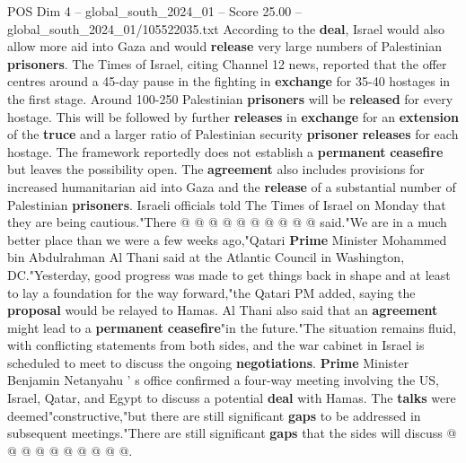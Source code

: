 \begin{textsample}{POS Dim 4 – global\_south\_2024\_01 – Score 25.00 – global\_south\_2024\_01/105522035.txt}
According to the \textbf{deal}, Israel would also allow more aid into Gaza and would \textbf{release} very large numbers of Palestinian \textbf{prisoners}.
The Times of Israel, citing Channel 12 news, reported that the offer centres around a 45-day pause in the fighting in \textbf{exchange} for 35-40 hostages in the first stage.
Around 100-250 Palestinian \textbf{prisoners} will be \textbf{released} for every hostage.
This will be followed by further \textbf{releases} in \textbf{exchange} for an \textbf{extension} of the \textbf{truce} and a larger ratio of Palestinian security \textbf{prisoner} \textbf{releases} for each hostage.
The framework reportedly does not establish a \textbf{permanent} \textbf{ceasefire} but leaves the possibility open.
The \textbf{agreement} also includes provisions for increased humanitarian aid into Gaza and the \textbf{release} of a substantial number of Palestinian \textbf{prisoners}.
Israeli officials told The Times of Israel on Monday that they are being cautious."There @ @ @ @ @ @ @ @ @ @ said."We are in a much better place than we were a few weeks ago,"Qatari \textbf{Prime} Minister Mohammed bin Abdulrahman Al Thani said at the Atlantic Council in Washington, DC."Yesterday, good progress was made to get things back in shape and at least to lay a foundation for the way forward,"the Qatari PM added, saying the \textbf{proposal} would be relayed to Hamas.
Al Thani also said that an \textbf{agreement} might lead to a \textbf{permanent} \textbf{ceasefire}"in the future."The situation remains fluid, with conflicting statements from both sides, and the war cabinet in Israel is scheduled to meet to discuss the ongoing \textbf{negotiations}. \textbf{Prime} Minister Benjamin Netanyahu ' s office confirmed a four-way meeting involving the US, Israel, Qatar, and Egypt to discuss a potential \textbf{deal} with Hamas.
The \textbf{talks} were deemed"constructive,"but there are still significant \textbf{gaps} to be addressed in subsequent meetings."There are still significant \textbf{gaps} that the sides will discuss @ @ @ @ @ @ @ @ @ @.

\end{textsample}
